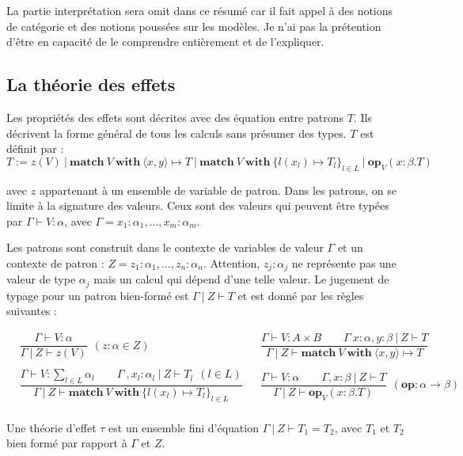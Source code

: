 La partie interprétation sera omit dans ce résumé car il fait appel à des notions de catégorie et des notions poussées sur les modèles. Je n'ai pas la prétention d'être en capacité de le comprendre entièrement et de l'expliquer.

\subsection{La théorie des effets}

	Les propriétés des effets sont décrites avec des équation entre patrons $T$. Ils décrivent la forme général de tous les calculs sans présumer des types. $T$ est définit par :
	\[T := z(V)~|~\textbf{match}~V~\textbf{with}~\langle x,y\rangle \mapsto T~|~\textbf{match}~V~\textbf{with}~\{l(x_l) \mapsto T_l\}_{l \in L}~|~\textbf{op}_V(x:\beta.T)\]
	
	avec $z$ appartenant à un ensemble de variable de patron. Dans les patrons, on se limite à la signature des valeurs. Ceux sont des valeurs qui peuvent être typées par $\Gamma \vdash V:\alpha$, avec $\Gamma = x_1:\alpha_1,...,x_m:\alpha_m$.
	\medbreak
	
	Les patrons sont construit dans le contexte de variables de valeur $\Gamma$ et un contexte de patron : $Z = z_1:\alpha_1,...,z_n:\alpha_n$. Attention, $z_j:\alpha_j$ ne représente pas une valeur de type $\alpha_j$ mais un calcul qui dépend d'une telle valeur.
	Le jugement de typage pour un patron bien-formé est $\Gamma~|~Z \vdash T$ et est donné par les règles suivantes :
	
	\begin{align*}
		&\dfrac{\Gamma \vdash V:\alpha}{\Gamma~|~Z \vdash z(V)}~~(z:\alpha \in Z) &
		&\dfrac{\Gamma \vdash V : A \times B\quad\quad\Gamma~x:\alpha,y:\beta~|~Z \vdash T}{\Gamma~|~Z \vdash \textbf{match}~V~\textbf{with}~\langle x,y\rangle  \mapsto T} \\\\
		&\dfrac{\Gamma \vdash V : \sum_{l \in L}\alpha_l\quad\quad\Gamma~,x_l:\alpha_l~|~Z \vdash T_l~~(l\in L)}{\Gamma~|~Z \vdash \textbf{match}~V~\textbf{with}~\{ l(x_l) \mapsto T_l\}_{l \in L}} &
		&\dfrac{\Gamma \vdash V:\alpha\quad\quad\Gamma,x:\beta~|~Z \vdash T}{\Gamma~|~Z \vdash \textbf{op}_V(x:\beta.T)}~~(\textbf{op}:\alpha \rightarrow \beta)\\
	\end{align*}
	
	Une théorie d'effet $\tau$ est un ensemble fini d'équation $\Gamma~|~Z \vdash T_1 = T_2$, avec $T_1$ et $T_2$ bien formé par rapport à $\Gamma$ et $Z$.
	
